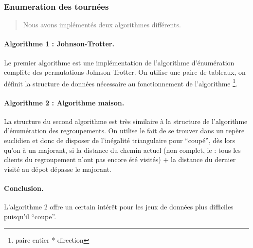 \documentclass[a4paper,10pt]{article}
\begin{document}
\subsubsection{Enumeration des tournées}

\begin{quote}
  Nous avons implémentés deux algorithmes différents.
\end{quote}
\paragraph{Algorithme 1 : Johnson-Trotter.}

Le premier algorithme est une implémentation de l'algorithme d'énumération complète des permutations Johnson-Trotter.
On utilise une paire de tableaux, on définit la structure de données nécessaire au fonctionnement de l'algorithme
\footnote{paire entier * direction}.

\paragraph{Algorithme 2 : Algorithme maison.}

La structure du second algorithme est très similaire à la structure de l'algorithme d'énumération des regroupements. 
On utilise le fait de se trouver dans un repère euclidien et donc de disposer de l'inégalité triangulaire pour ``coupé'',
dès lors qu'on à un majorant, si la distance du chemin actuel (non complet, ie : tous les clients du regroupement
n'ont pas encore été visités) + la distance du dernier visité au dépot dépasse le majorant.

\paragraph{Conclusion.}

L'algorithme 2 offre un certain intérêt pour les jeux de données plus difficiles puisqu'il ``coupe''.
\end{document}
